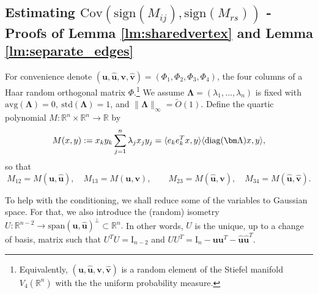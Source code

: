\documentclass[reqno]{amsart}
\numberwithin{equation}{section}
\newcommand\R{\mathbb{R}}
\newcommand\bu{\bm{u}}
\newcommand\hu{\hat{\bm u}}
\newcommand\bv{\bm{v}}
\newcommand\hv{\hat{\bm v}}
\newcommand{\diag}{\mathop {\rm diag}}
\newcommand{\av}{\mathrm{avg}}
\newcommand{\std}{\mathrm{std}}
\newcommand{\Cov}{\mathrm{Cov}}
\begin{document}
\subsection{Estimating $\Cov(\mathrm{sign}(M_{ij}),\mathrm{sign}(M_{rs}))$ - Proofs of Lemma \ref{lm:sharedvertex} and Lemma \ref{lm:separate_edges}}\label{sec:variance}


For convenience denote $(\bu,\hu,\bv,\hv)=(\Phi_{1},\Phi_2,\Phi_3,\Phi_4)$, the four columns of a Haar random orthogonal matrix $\Phi$.\footnote{Equivalently, $(\bu,\hu,\bv,\hv)$ is a random element of the Stiefel manifold $V_{4} (\R^n)$ with the the uniform probability measure.} 
We assume $\bm\Lambda=(\lambda_1,\ldots,\lambda_n)$ is fixed with $\av(\bm\Lambda)=0,\ \std(\bm\Lambda)=1$, and $\|\bm\Lambda\|_{\infty}=\tilde{O}(1)$. Define the quartic polynomial $M:\R^n\times \R^n\to \R$ by
\begin{equation} \label{eq:Mdef}
    M(x,y) := x_ky_k \sum\limits_{j=1}^n\lambda_jx_jy_j=\langle e_{k}e_{k}^Tx,y\rangle\langle \diag(\bm\Lambda)x,y\rangle,
\end{equation}
so that
\begin{equation} \label{eq:identities}
    M_{12} = M(\bu,\hu), \quad M_{13} = M(\bu,\bv),\quad \quad M_{23} = M(\hu,\bv),\quad M_{34} = M(\hu,\hv).
\end{equation}

To help with the conditioning, we shall reduce some of the variables to Gaussian space. For that, we also introduce the (random) isometry $U:\R^{n-2} \to \mathrm{span}(\bu,\hu)^\perp \subset \R^{n}.$ In other words, $U$ is the unique, up to a change of basis, matrix such that $U^TU = \mathrm{I}_{n-2}$ and $UU^T = \mathrm{I}_n - \bu\bu^T - \hu\hu^T.$







\end{document}
